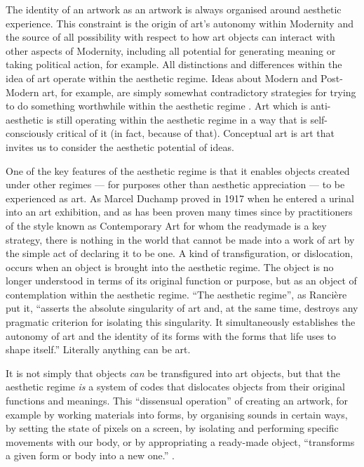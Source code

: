 \documentclass[letterpaper]{article}
\begin{document}
    The identity of an artwork as an artwork is always organised around aesthetic experience. This constraint is the origin of art's autonomy within Modernity and the source of all possibility with respect to how art objects can interact with other aspects of Modernity, including all potential for generating meaning or taking political action, for example. All distinctions and differences within the idea of art operate within the aesthetic regime. Ideas about Modern and Post-Modern art, for example, are simply somewhat contradictory strategies for trying to do something worthwhile within the aesthetic regime \citep[p213]{ZepkeSblmArt2017}. Art which is anti-aesthetic is still operating within the aesthetic regime in a way that is self-consciously critical of it (in fact, because of that). Conceptual art is art that invites us to consider the aesthetic potential of ideas.

    One of the key features of the aesthetic regime is that it enables objects created under other regimes — for purposes other than aesthetic appreciation — to be experienced as art. As Marcel Duchamp proved in 1917 when he entered a urinal into an art exhibition, and as has been proven many times since by practitioners of the style known as Contemporary Art for whom the readymade is a key strategy, there is nothing in the world that cannot be made into a work of art by the simple act of declaring it to be one. A kind of transfiguration, or dislocation, occurs when an object is brought into the aesthetic regime. The object is no longer understood in terms of its original function or purpose, but as an object of contemplation within the aesthetic regime. “The aesthetic regime”, as Rancière put it, “asserts the absolute singularity of art and, at the same time, destroys any pragmatic criterion for isolating this singularity. It simultaneously establishes the autonomy of art and the identity of its forms with the forms that life uses to shape itself.” Literally anything can be art.
    
    It is not simply that objects \emph{can} be transfigured into art objects, but that the aesthetic regime \emph{is} a system of codes that dislocates objects from their original functions and meanings. This “dissensual operation” of creating an artwork, for example by working materials into forms, by organising sounds in certain ways, by setting the state of pixels on a screen, by isolating and performing specific movements with our body, or by appropriating a ready-made object, “transforms a given form or body into a new one.” \citep[p.54]{RancierThEmncptdSpcttr2009}.
\end{document}
